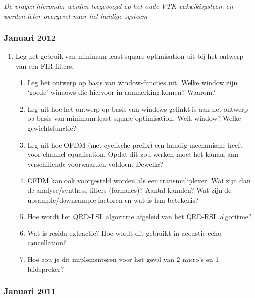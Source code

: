 \documentclass[
  a4paper,
  ,captions=tableheading
]{scrartcl}
\providecommand{\tightlist}{%
  \setlength{\itemsep}{0pt}\setlength{\parskip}{0pt}}
\begin{document}
\emph{De vragen hieronder werden toegevoegd op het oude VTK
vakwikisysteem en werden later overgezet naar het huidige systeem}

\subsubsection{\texorpdfstring{\textbf{Januari
2012}}{Januari 2012}}\label{januari-2012}

\begin{enumerate}
\def\labelenumi{\arabic{enumi}.}
\tightlist
\item
  Leg het gebruik van minimum least square optimisation uit bij het
  ontwerp van een FIR filters.

  \begin{enumerate}
  \def\labelenumii{\arabic{enumii}.}
  \setcounter{enumii}{1}
  \tightlist
  \item
    Leg het ontwerp op basis van window-functies uit. Welke window zijn
    `goede' windows die hiervoor in aanmerking komen? Waarom?\\
  \item
    Leg uit hoe het ontwerp op basis van windows gelinkt is aan het
    ontwerp op basis van minimum least square optimisation. Welk window?
    Welke gewichtsfunctie?\\
  \item
    Leg uit hoe OFDM (met cyclische prefix) een handig mechanisme heeft
    voor channel equalisation. Opdat dit zou werken moet het kanaal aan
    verschillende voorwaarden voldoen. Dewelke?\\
  \item
    OFDM kan ook voorgesteld worden als een transmuliplexer. Wat zijn
    dan de analyse/synthese filters (formules)? Aantal kanalen? Wat zijn
    de upsample/downsample factoren en wat is hun betekenis?\\
  \item
    Hoe wordt het QRD-LSL algoritme afgeleid van het QRD-RSL
    algoritme?\\
  \item
    Wat is residu-extractie? Hoe wordt dit gebruikt in acoustic echo
    cancellation?\\
  \item
    Hoe zou je dit implementeren voor het geval van 2 micro's en 1
    luidspreker?
  \end{enumerate}
\end{enumerate}

\subsubsection{\texorpdfstring{\textbf{Januari
2011}}{Januari 2011}}\label{januari-2011}
\end{document}
